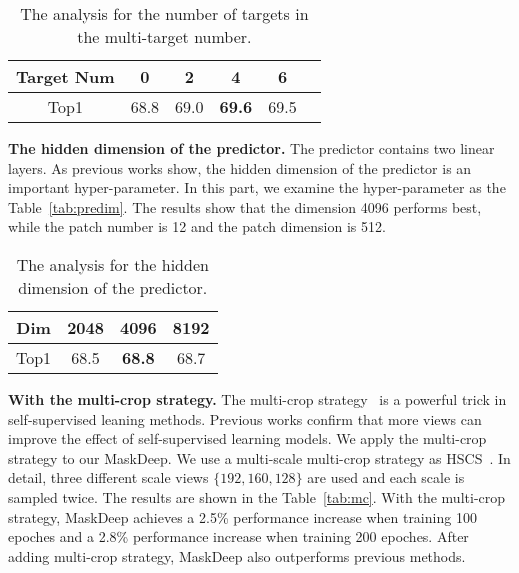 \documentclass[10pt,twocolumn,letterpaper]{article}
\begin{document}
\begin{table}[h]
\centering
\caption{The analysis for the number of targets in the multi-target number.}
\begin{tabular}{cccccc}
\toprule
Target Num  & 0  & 2  & 4 & 6 \\
\midrule 
Top1 &  68.8  &69.0  &\textbf{69.6}  &  69.5  \\
\bottomrule
\end{tabular}

\label{tab:multitarget}
\end{table}

\noindent\textbf{The hidden dimension of the predictor.} The predictor contains two linear layers. As previous works show, the hidden dimension of the predictor is an important hyper-parameter. In this part, we examine the hyper-parameter as the Table~\ref{tab:predim}. The results show that the dimension 4096 performs best, while the patch number is 12 and the patch dimension is 512.

\begin{table}[h]
\centering
\caption{The analysis for the hidden dimension of the predictor.}
\begin{tabular}{cccc}
\toprule
Dim  & 2048  & 4096  & 8192 \\
\midrule 
 Top1 & 68.5 &   \textbf{68.8}  &   68.7     \\
\bottomrule
\end{tabular}
\label{tab:predim}
\label{tab:main}
\end{table}

\noindent\textbf{With the multi-crop strategy.} The multi-crop strategy~\cite{swav} is a powerful trick in self-supervised leaning methods. Previous works confirm that more views can improve the effect of self-supervised learning models. We apply the multi-crop strategy to our MaskDeep. We use a multi-scale multi-crop strategy as HSCS~\cite{guo2022hcsc}. In detail, three different scale views $\{192,160,128\}$ are used and each scale is sampled twice.
The results are shown in the Table~\ref{tab:mc}. With the multi-crop strategy, MaskDeep achieves a 2.5\% performance increase when training 100 epoches and a 2.8\% performance increase when training 200 epoches. After adding multi-crop strategy, MaskDeep also outperforms previous methods.
\end{document}
